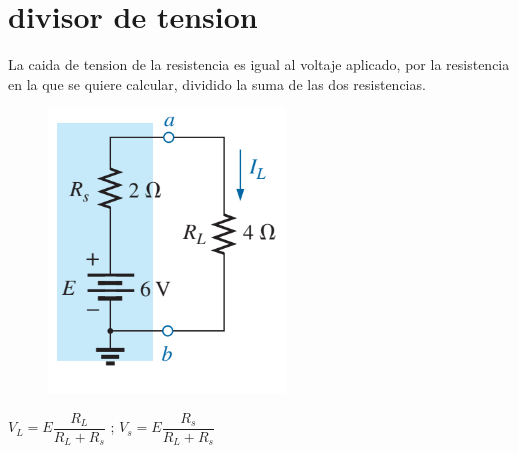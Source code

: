 \section*{divisor de tension}
\justifying
La caida de tension de la resistencia es igual al voltaje aplicado, por la resistencia en la que se quiere calcular, dividido la suma de las dos resistencias.
\begin{figure}[h]
	\centering
	\includegraphics[width=0.4\linewidth]{imagenes/screenshot002}
	\label{fig:screenshot002}
\end{figure}

\centering $ V_L = E \dfrac{R_L}{R_L + R_s} $ ;
\centering $ V_s = E \dfrac{R_s}{R_L + R_s} $ 
